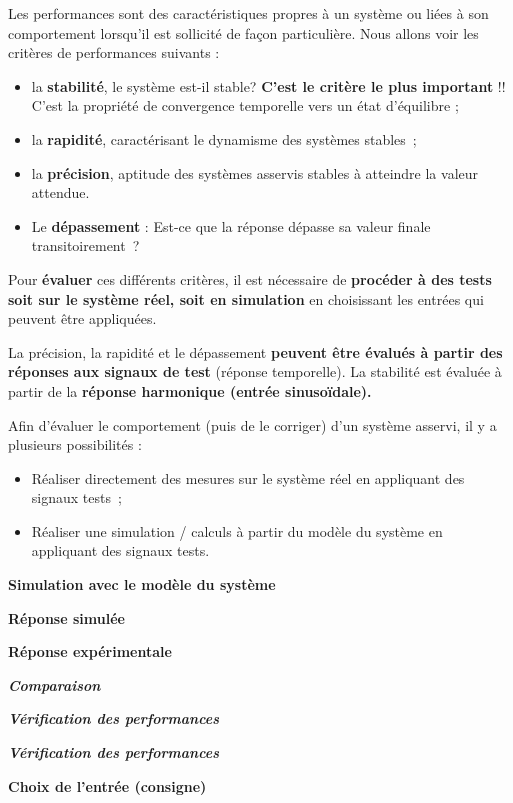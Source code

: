 Les performances sont des caractéristiques propres à un système ou liées
à son comportement lorsqu'il est sollicité de façon particulière. Nous
allons voir les critères de performances suivants :

\begin{itemize}
\item
  la \textbf{stabilité}, le système est-il stable? \textbf{C'est le
  critère le plus important} !! C'est la propriété de convergence
  temporelle vers un état d'équilibre ;
\item
  la \textbf{rapidité}, caractérisant le dynamisme des systèmes
  stables~;
\item
  la \textbf{précision}, aptitude des systèmes asservis stables à
  atteindre la valeur attendue.
\item
  Le \textbf{dépassement} : Est-ce que la réponse dépasse sa valeur
  finale transitoirement~?
\end{itemize}

Pour \textbf{évaluer} ces différents critères, il est nécessaire de
\textbf{procéder à des tests soit sur le système réel, soit en
simulation} en choisissant les entrées qui peuvent être appliquées.

La précision, la rapidité et le dépassement \textbf{peuvent être évalués
à partir des réponses aux signaux de test} (réponse temporelle). La
stabilité est évaluée à partir de la \textbf{réponse harmonique (entrée
sinusoïdale).}

Afin d'évaluer le comportement (puis de le corriger) d'un système
asservi, il y a plusieurs possibilités :

\begin{itemize}
\item
  Réaliser directement des mesures sur le système réel en appliquant des
  signaux tests~;
\item
  Réaliser une simulation / calculs à partir du modèle du système en
  appliquant des signaux tests.
\end{itemize}

\textbf{Simulation avec le modèle du système}

\textbf{Réponse simulée}

\textbf{Réponse expérimentale}

\emph{\textbf{Comparaison}}

\emph{\textbf{Vérification des performances}}

\emph{\textbf{Vérification des performances}}

\textbf{Choix de l'entrée (consigne)}

